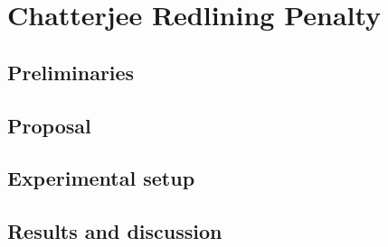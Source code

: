 \chapter{Chatterjee Redlining Penalty}

\section{Preliminaries}

\section{Proposal}

\section{Experimental setup}

\section{Results and discussion}
